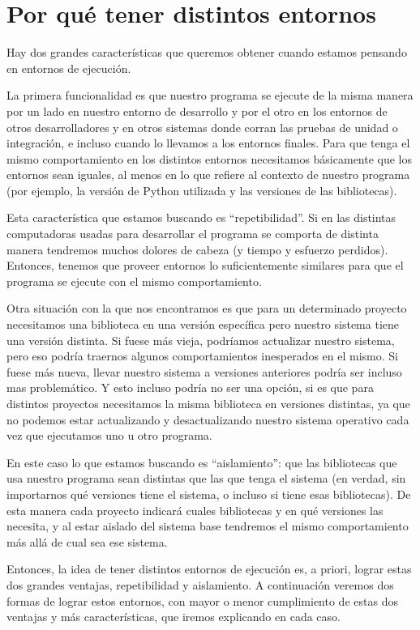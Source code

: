 \section{Por qué tener distintos entornos}

Hay dos grandes características que queremos obtener cuando estamos pensando en entornos de ejecución.

La primera funcionalidad es que nuestro programa se ejecute de la misma manera por un lado en nuestro entorno de desarrollo y por el otro en los entornos de otros desarrolladores y en otros sistemas donde corran las pruebas de unidad o integración, e incluso cuando lo llevamos a los entornos finales. Para que tenga el mismo comportamiento en los distintos entornos necesitamos básicamente que los entornos sean iguales, al menos en lo que refiere al contexto de nuestro programa (por ejemplo, la versión de Python utilizada y las versiones de las bibliotecas).

Esta característica que estamos buscando es ``repetibilidad''. Si en las distintas computadoras usadas para desarrollar el programa se comporta de distinta manera tendremos muchos dolores de cabeza (y tiempo y esfuerzo perdidos). Entonces, tenemos que proveer entornos lo suficientemente similares para que el programa se ejecute con el mismo comportamiento.

Otra situación con la que nos encontramos es que para un determinado proyecto necesitamos una biblioteca en una versión específica pero nuestro sistema tiene una versión distinta. Si fuese más vieja, podríamos actualizar nuestro sistema, pero eso podría traernos algunos comportamientos inesperados en el mismo. Si fuese más nueva, llevar nuestro sistema a versiones anteriores podría ser incluso mas problemático. Y esto incluso podría no ser una opción, si es que para distintos proyectos necesitamos la misma biblioteca en versiones distintas, ya que no podemos estar actualizando y desactualizando nuestro sistema operativo cada vez que ejecutamos uno u otro programa.

En este caso lo que estamos buscando es ``aislamiento'': que las bibliotecas que usa nuestro programa sean distintas que las que tenga el sistema (en verdad, sin importarnos qué versiones tiene el sistema, o incluso si tiene esas bibliotecas). De esta manera cada proyecto indicará cuales bibliotecas y en qué versiones las necesita, y al estar aislado del sistema base tendremos el mismo comportamiento más allá de cual sea ese sistema.

Entonces, la idea de tener distintos entornos de ejecución es, a priori, lograr estas dos grandes ventajas, repetibilidad y aislamiento. A continuación veremos dos formas de lograr estos entornos, con mayor o menor cumplimiento de estas dos ventajas y más características, que iremos explicando en cada caso. 

